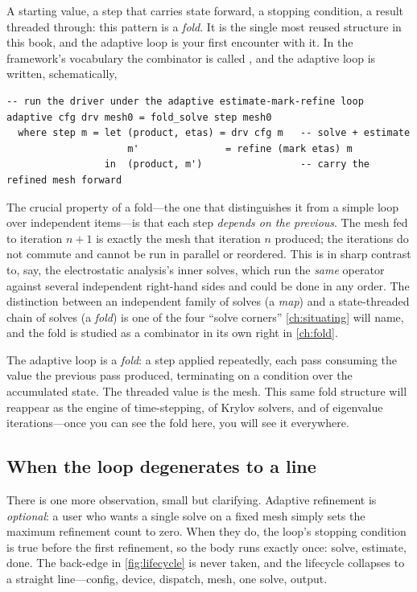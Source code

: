 A starting value, a step that carries state forward, a stopping condition, a
result threaded through: this pattern is a \emph{fold}. It is the single most
reused structure in this book, and the adaptive loop is your first encounter with
it. In the framework's vocabulary the combinator is called ,
and the adaptive loop is written, schematically,
\begin{lstlisting}[style=l4style]
-- run the driver under the adaptive estimate-mark-refine loop
adaptive cfg drv mesh0 = fold_solve step mesh0
  where step m = let (product, etas) = drv cfg m   -- solve + estimate
                     m'               = refine (mark etas) m
                 in  (product, m')                 -- carry the refined mesh forward
\end{lstlisting}

The crucial property of a fold---the one that distinguishes it from a simple
loop over independent items---is that each step \emph{depends on the previous}.
The mesh fed to iteration $n+1$ is exactly the mesh that iteration $n$ produced;
the iterations do not commute and cannot be run in parallel or reordered. This is
in sharp contrast to, say, the electrostatic analysis's inner solves, which run
the \emph{same} operator against several independent right-hand sides and could
be done in any order. The distinction between an independent family of solves (a
\emph{map}) and a state-threaded chain of solves (a \emph{fold}) is one of the
four ``solve corners'' \cref{ch:situating} will name, and the fold is studied as a
combinator in its own right in \cref{ch:fold}.

\begin{keyidea}
The adaptive loop is a \emph{fold}: a step applied repeatedly, each pass
consuming the value the previous pass produced, terminating on a condition over
the accumulated state. The threaded value is the mesh. This same fold structure
will reappear as the engine of time-stepping, of Krylov solvers, and of
eigenvalue iterations---once you can see the fold here, you will see it
everywhere.
\end{keyidea}

\subsection{When the loop degenerates to a line}

There is one more observation, small but clarifying. Adaptive refinement is
\emph{optional}: a user who wants a single solve on a fixed mesh simply sets the
maximum refinement count to zero. When they do, the loop's stopping condition is
true before the first refinement, so the body runs exactly once: solve, estimate,
done. The back-edge in \cref{fig:lifecycle} is never taken, and the lifecycle
collapses to a straight line---config, device, dispatch, mesh, one solve, output.

